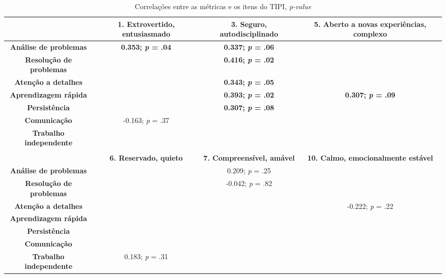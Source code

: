 \begin{sidewaystable}[ph!]
\footnotesize
\caption{\small Correlações entre as métricas e os itens do TIPI, \textsl{p-value}}
\renewcommand{\arraystretch}{1.4} 
\centering
\begin{tabular}{lccc}

    \toprule
          & \textbf{1. Extrovertido, entusiasmado} & \textbf{3. Seguro, autodisciplinado} & \textbf{5. Aberto a novas experiências, complexo} \\
    \midrule
    \multicolumn{1}{c}{\textbf{Análise de problemas}} 	& \textbf{0.353; \textsl{p} = .04}  & \textbf{0.337; \textsl{p} = .06} & \textbf{} \\
    \multicolumn{1}{c}{\textbf{Resolução de problemas}} &																	  & \textbf{0.416; \textsl{p} = .02} & \textbf{} \\
    \multicolumn{1}{c}{\textbf{Atenção a detalhes}} 		&																		& \textbf{0.343; \textsl{p} = .05} & \\
    \multicolumn{1}{c}{\textbf{Aprendizagem rápida}} 		&																		& \textbf{0.393; \textsl{p} = .02} & \textbf{0.307; \textsl{p} = .09} \\
    \multicolumn{1}{c}{\textbf{Persistência}} 					&																		& \textbf{0.307; \textsl{p} = .08} & \\
    \multicolumn{1}{c}{\textbf{Comunicação}} 						& -0.163; \textsl{p} = .37					&																	 &  \\
    \multicolumn{1}{c}{\textbf{Trabalho independente}} 	&																		&																	 &  \\
		
          &  &  &  \\

		\toprule					
          & \textbf{6. Reservado, quieto} & \textbf{7. Compreensível, amável} & \textbf{10. Calmo, emocionalmente estável} \\
		\midrule			
    \multicolumn{1}{c}{\textbf{Análise de problemas}} 	&													& 0.209;  \textsl{p} = .25 &  \\
    \multicolumn{1}{c}{\textbf{Resolução de problemas}} &													& -0.042; \textsl{p} = .82 &  \\
    \multicolumn{1}{c}{\textbf{Atenção a detalhes}} 		&													&       									 & -0.222; \textsl{p} = .22 \\
    \multicolumn{1}{c}{\textbf{Aprendizagem rápida}} 		&													&       									 &  \\
    \multicolumn{1}{c}{\textbf{Persistência}} 					&													&       									 &  \\
    \multicolumn{1}{c}{\textbf{Comunicação}} 						&													&       									 &  \\
    \multicolumn{1}{c}{\textbf{Trabalho independente}}	& 0.183; \textsl{p} = .31 &       									 &  \\
		

\end{tabular}
\end{sidewaystable}
